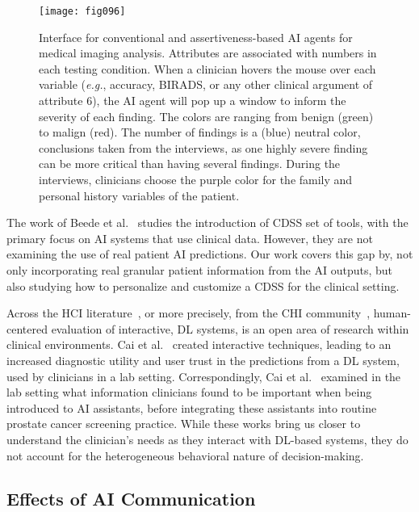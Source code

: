 \begin{figure*}[htpb]
\centering
\texttt{[image: fig096]}
\caption[]{Interface for conventional and assertiveness-based AI agents for medical imaging analysis. Attributes are associated with numbers in each testing condition. When a clinician hovers the mouse over each variable ({\it e.g.}, accuracy, BIRADS, or any other clinical argument of attribute 6), the AI agent will pop up a window to inform the severity of each finding. The colors are ranging from benign (green) to malign (red). The number of findings is a (blue) neutral color, conclusions taken from the interviews, as one highly severe finding can be more critical than having several findings. During the interviews, clinicians choose the purple color for the family and personal history variables of the patient.}
\label{fig:fig096}
\end{figure*}

The work of Beede et al.~\cite{10.1145/3313831.3376718} studies the introduction of CDSS set of tools, with the primary focus on AI systems that use clinical data.
However, they are not examining the use of real patient AI predictions.
Our work covers this gap by, not only incorporating real granular patient information from the AI outputs, but also studying how to personalize and customize a CDSS for the clinical setting.

Across the HCI literature~\cite{10.1145/3311957.3359433, 10.1145/3359206, Fitzpatrick2013, 10.1145/3538882.3542790}, or more precisely, from the CHI community~\cite{10.1145/3313831.3376718, 10.1145/3290605.3300234}, human-centered evaluation of interactive, DL systems, is an open area of research within clinical environments.
Cai et al.~\cite{10.1145/3290605.3300234} created interactive techniques, leading to an increased diagnostic utility and user trust in the predictions from a DL system, used by clinicians in a lab setting.
Correspondingly, Cai et al.~\cite{10.1145/3359206} examined in the lab setting what information clinicians found to be important when being introduced to AI assistants, before integrating these assistants into routine prostate cancer screening practice.
While these works bring us closer to understand the clinician's needs as they interact with DL-based systems, they do not account for the heterogeneous behavioral nature of decision-making.

\subsection{Effects of AI Communication}
\label{sec:chap006002004}

